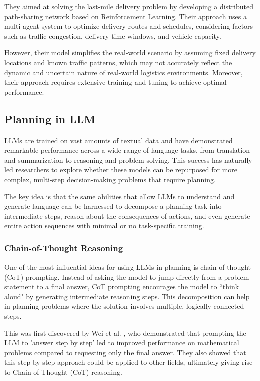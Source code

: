 They aimed at solving the last-mile delivery problem by developing a distributed
path-sharing network based on Reinforcement Learning. Their approach uses a multi-agent
system to optimize delivery routes and schedules, considering factors such as
traffic congestion, delivery time windows, and vehicle capacity.

However, their model simplifies the real-world scenario by assuming fixed delivery
locations and known traffic patterns, which may not accurately reflect the
dynamic and uncertain nature of real-world logistics environments. Moreover,
their approach requires extensive training and tuning to achieve optimal
performance.

\subsection{Planning in LLM}
\label{sub:planning_in_llm}

LLMs are trained on vast amounts of textual data and have demonstrated remarkable
performance across a wide range of language tasks, from translation and
summarization to reasoning and problem-solving. This success has naturally led researchers
to explore whether these models can be repurposed for more complex, multi-step
decision-making problems that require planning.

The key idea is that the same abilities that allow LLMs to understand and
generate language can be harnessed to decompose a planning task into
intermediate steps, reason about the consequences of actions, and even generate
entire action sequences with minimal or no task-specific training.

\subsubsection{Chain-of-Thought Reasoning}

One of the most influential ideas for using LLMs in planning is chain-of-thought
(CoT) prompting. Instead of asking the model to jump directly from a problem
statement to a final answer, CoT prompting encourages the model to ``think aloud"
by generating intermediate reasoning steps. This decomposition can help in planning
problems where the solution involves multiple, logically connected steps.

This was first discovered by Wei et al. \cite{wei2023chainofthoughtpromptingelicitsreasoning},
who demonstrated that prompting the LLM to 'answer step by step' led to improved
performance on mathematical problems compared to requesting only the final
answer. They also showed that this step-by-step approach could be applied to other
fields, ultimately giving rise to Chain-of-Thought (CoT) reasoning.

